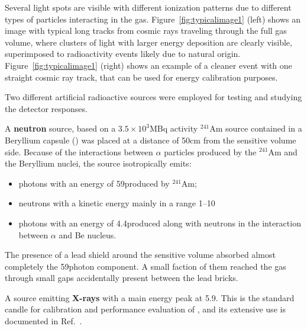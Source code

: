 \documentclass[12pt]{iopart}
\begin{document}
Several light
spots are visible with different ionization patterns due to
different types of particles interacting in the gas.
Figure~\ref{fig:typicalimage1} (left) shows an image with typical long
tracks from cosmic rays traveling through the full gas volume, where
clusters of light with larger energy deposition are clearly visible,
superimposed to radioactivity events likely due to natural origin.
Figure~\ref{fig:typicalimage1} (right) shows an example of a cleaner
event with one straight cosmic ray track, that can be used for energy
calibration purposes.

Two different artificial radioactive sources were employed for testing and studying the detector responses.

\vspace{10pt}

A {\bf neutron} source, based on a $3.5\times10^3$\unit{MBq} activity
$^{241}$Am source contained in a Beryllium capsule (\ambe) was placed
at a distance of 50\unit{cm} from the sensitive volume side.  Because
of the interactions between $\alpha$ particles produced by the
$^{241}$Am and the Beryllium nuclei, the \ambe source isotropically
emits:
 \begin{itemize}
     \item photons with an energy of 59\keV produced by $^{241}$Am;
     \item neutrons with a kinetic energy mainly in a range 1--10\MeV
     \item photons with an energy of 4.4\MeV produced along with
       neutrons in the interaction between $\alpha$ and Be nucleus.
 \end{itemize}
 The presence of a lead shield around the sensitive volume absorbed
almost completely the 59\keV photon component. A small faction of them
reached the gas through small gaps accidentally present between the lead
bricks.

\vspace{10pt}

A \fe source emitting {\bf X-rays} with a main energy peak at 5.9\keV.
This is the standard candle for calibration and performance evaluation
of \lemon, and its extensive use is documented in
Ref.~\cite{bib:fe55}.

\vspace{10pt}
\end{document}
